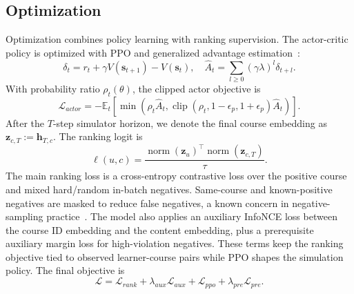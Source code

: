 \documentclass[letterpaper]{article}
\begin{document}
\subsection{Optimization}
Optimization combines policy learning with ranking supervision. The actor-critic policy is optimized with PPO and generalized advantage estimation~\cite{schulman2017ppo,schulman2015gae}:
\begin{equation}
\delta_t=r_t+\gamma V(\mathbf{s}_{t+1})-V(\mathbf{s}_t),
\quad
\hat{A}_t=\sum_{l\geq 0}(\gamma\lambda)^l\delta_{t+l}.
\end{equation}
With probability ratio \(\rho_t(\theta)\), the clipped actor objective is
\begin{equation}
\mathcal{L}_{actor}=
-\mathbb{E}_t\left[
\min(\rho_t\hat{A}_t,
\operatorname{clip}(\rho_t,1-\epsilon_p,1+\epsilon_p)\hat{A}_t)
\right].
\end{equation}
After the \(T\)-step simulator horizon, we denote the final course embedding as \(\mathbf{z}_{c,T}:=\mathbf{h}_{T,c}\). The ranking logit is
\begin{equation}
\ell(u,c)=\frac{\operatorname{norm}(\mathbf{z}_u)^\top
\operatorname{norm}(\mathbf{z}_{c,T})}{\tau}.
\end{equation}
The main ranking loss is a cross-entropy contrastive loss over the positive course and mixed hard/random in-batch negatives. Same-course and known-positive negatives are masked to reduce false negatives, a known concern in negative-sampling practice~\cite{ma2026negative}. The model also applies an auxiliary InfoNCE loss between the course ID embedding and the content embedding, plus a prerequisite auxiliary margin loss for high-violation negatives. These terms keep the ranking objective tied to observed learner-course pairs while PPO shapes the simulation policy. The final objective is
\begin{equation}
\mathcal{L}=
\mathcal{L}_{rank}
+\lambda_{aux}\mathcal{L}_{aux}
+\mathcal{L}_{ppo}
+\lambda_{pre}\mathcal{L}_{pre}.
\end{equation}
\end{document}
